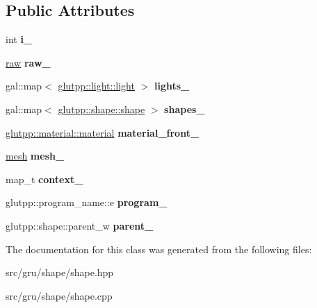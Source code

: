 \subsection*{\-Public \-Attributes}
\begin{DoxyCompactItemize}
\item 
\hypertarget{classglutpp_1_1shape_1_1shape_a963f3a4b84d97461e834290edf73e403}{int {\bfseries i\-\_\-}}\label{classglutpp_1_1shape_1_1shape_a963f3a4b84d97461e834290edf73e403}

\item 
\hypertarget{classglutpp_1_1shape_1_1shape_a739d3c33effd15e2310938745e161db4}{\hyperlink{classglutpp_1_1shape_1_1raw}{raw} {\bfseries raw\-\_\-}}\label{classglutpp_1_1shape_1_1shape_a739d3c33effd15e2310938745e161db4}

\item 
\hypertarget{classglutpp_1_1shape_1_1shape_a4867d4995d7601c427ca14bb3724f01d}{gal\-::map$<$ \hyperlink{classglutpp_1_1light_1_1light}{glutpp\-::light\-::light} $>$ {\bfseries lights\-\_\-}}\label{classglutpp_1_1shape_1_1shape_a4867d4995d7601c427ca14bb3724f01d}

\item 
\hypertarget{classglutpp_1_1shape_1_1shape_a8d531d6132ea4c7ae732d07316deddf2}{gal\-::map$<$ \hyperlink{classglutpp_1_1shape_1_1shape}{glutpp\-::shape\-::shape} $>$ {\bfseries shapes\-\_\-}}\label{classglutpp_1_1shape_1_1shape_a8d531d6132ea4c7ae732d07316deddf2}

\item 
\hypertarget{classglutpp_1_1shape_1_1shape_a4a8c3bd997b65947911c268760ab9215}{\hyperlink{classglutpp_1_1material_1_1material}{glutpp\-::material\-::material} {\bfseries material\-\_\-front\-\_\-}}\label{classglutpp_1_1shape_1_1shape_a4a8c3bd997b65947911c268760ab9215}

\item 
\hypertarget{classglutpp_1_1shape_1_1shape_a41f1e4b0c44406b6d0e61c7d8ebd7442}{\hyperlink{classglutpp_1_1mesh}{mesh} {\bfseries mesh\-\_\-}}\label{classglutpp_1_1shape_1_1shape_a41f1e4b0c44406b6d0e61c7d8ebd7442}

\item 
\hypertarget{classglutpp_1_1shape_1_1shape_af98ad3c87922d064515ccca1a19c200c}{map\-\_\-t {\bfseries context\-\_\-}}\label{classglutpp_1_1shape_1_1shape_af98ad3c87922d064515ccca1a19c200c}

\item 
\hypertarget{classglutpp_1_1shape_1_1shape_a539fc204bb3d66edfd27d5b4fa4d6824}{glutpp\-::program\-\_\-name\-::e {\bfseries program\-\_\-}}\label{classglutpp_1_1shape_1_1shape_a539fc204bb3d66edfd27d5b4fa4d6824}

\item 
\hypertarget{classglutpp_1_1shape_1_1shape_adfdf982474ebdd3d4de09a6cbf895155}{glutpp\-::shape\-::parent\-\_\-w {\bfseries parent\-\_\-}}\label{classglutpp_1_1shape_1_1shape_adfdf982474ebdd3d4de09a6cbf895155}

\end{DoxyCompactItemize}


\-The documentation for this class was generated from the following files\-:\begin{DoxyCompactItemize}
\item 
src/gru/shape/shape.\-hpp\item 
src/gru/shape/shape.\-cpp\end{DoxyCompactItemize}
